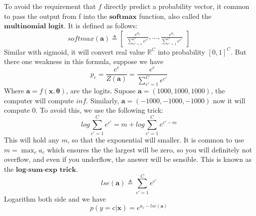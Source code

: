 \documentclass[10pt,landscape]{article}
\newcommand{\inp}{\textbf{x}}
\newcommand{\parameter}{\boldsymbol{\theta}}
\newcommand{\R}{\mathbb{R}}
\begin{document}
\begin{multicols*}{3}
To avoid the requirement that $f$ directly predict a probability vector, it common to pass the output from f into the $\textbf{softmax}$ function, also called the $\textbf{multinomial logit}$. It is defined as follows:
\[
    softmax(\mathbf{a})\triangleq
    \begin{bmatrix}
        \frac{e^{a_1}}{\sum_{c'=1}^{C}e^{c'}},...,
        \frac{e^{a_c}}{\sum_{c'=1}^{C}e^{c'}}
    \end{bmatrix}
\]
Similar with sigmoid, it will convert real value $\R^C$ into probability $[0,1]^C$.
But there one weakness in this formula, suppose we have
\[
    p_c=\frac{e^c}{Z(\mathbf{a})}=\frac{e^c}{\sum_{c'=1}^{C}e^{c'}}
\]
Where $\mathbf{a}=f(\inp,\parameter)$, are the logits.
Supose $\mathbf{a}=(1000,1000,1000)$, the computer will compute $inf$. Similarly, $\mathbf{a}=(-1000,-1000,-1000)$ now it will compute $0$. To avoid this, we use the following trick:
\[
    log\sum_{c'=1}^{C}e^{c'} = m +log\sum_{c'=1}^{C}e^{c'-m}
\]
This will hold any $m$, so that the exponential will smaller. It is common to use $m=\max_ca_c$ which ensures the the largest will be zero, so you will definitely not overflow, and even if you underflow, the answer will be sensible. This is known as the $\textbf{log-sum-exp trick}$.
\[
    lse(\mathbf{a})\triangleq \sum_{c'=1}^{C}e^{c'}
\]
Logarithm both side and we have
\[
    p(y=c|\inp)=e^{a_c-lse(\mathbf a)}
\]

\end{multicols*}
\end{document}

